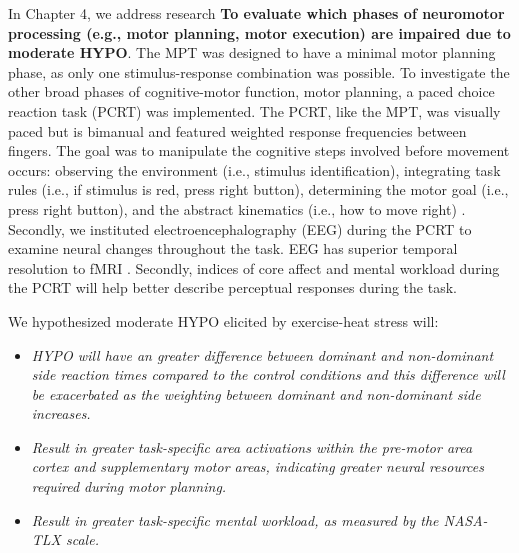 In Chapter 4, we address research \textbf{To evaluate which phases of neuromotor processing (e.g., motor planning, motor execution) are impaired due to moderate HYPO}. The MPT was designed to have a minimal motor planning phase, as only one stimulus-response combination was possible. To investigate the other broad phases of cognitive-motor function, motor planning, a paced choice reaction task (PCRT) was implemented. The PCRT, like the MPT, was visually paced but is bimanual and featured weighted response frequencies between fingers. The goal was to manipulate the cognitive steps involved before movement occurs: observing the environment (i.e., stimulus identification), integrating task rules (i.e., if stimulus is red, press right button), determining the motor goal (i.e., press right button), and the abstract kinematics (i.e., how to move right) \cite{wong_motor_2015}. Secondly, we instituted electroencephalography (EEG) during the PCRT to examine neural changes throughout the task. EEG has superior temporal resolution to fMRI \cite{mehta_neuroergonomics:_2013}. Secondly, indices of core affect and mental workload during the PCRT will help better describe perceptual responses during the task.

We hypothesized moderate HYPO elicited by exercise-heat stress will:
        
\begin{itemize}
	\item \textit{HYPO will have an greater difference between dominant and non-dominant side reaction times compared to the control conditions and this difference will be exacerbated as the weighting between dominant and non-dominant side increases.}
	
	\item \textit{Result in greater task-specific area activations within the pre-motor area cortex and supplementary motor areas, indicating greater neural resources required during motor planning.}
	
	\item \textit{Result in greater task-specific mental workload, as measured by the NASA-TLX scale.}
\end{itemize}



